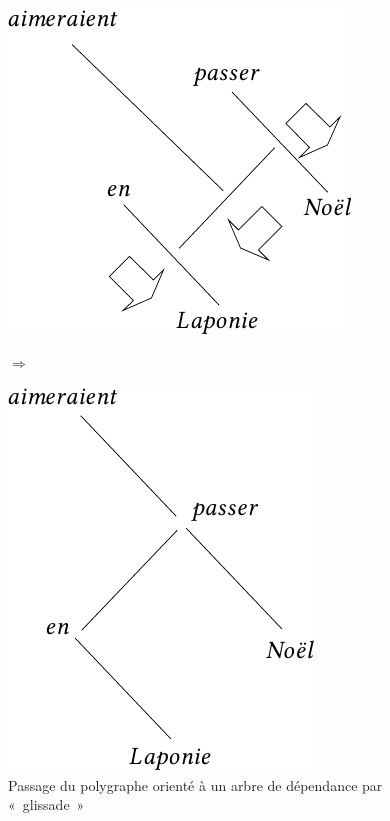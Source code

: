 \begin{figure}
\begin{minipage}{.45\textwidth}\centering
\includegraphics[scale=0.9]{figures/polygraphs/poly-3.4.23-2.pdf}
\end{minipage}\hfill%
\begin{minipage}{.05\textwidth}\centering
\huge$\Rightarrow$
\end{minipage}\hfill%
\begin{minipage}{.45\textwidth}\centering
\includegraphics[scale=0.9]{figures/polygraphs/poly-3.4.23-3.pdf}
\end{minipage}
\small
\caption{\label{fig:glissade}Passage du polygraphe orienté à un arbre de dépendance par «~glissade~»}
\end{figure}



